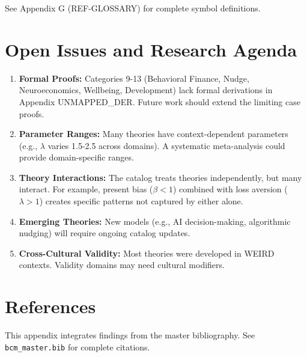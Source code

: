 See Appendix G (REF-GLOSSARY) for complete symbol definitions.

\section{Open Issues and Research Agenda}
\label{sec:ms-open-issues}

\begin{enumerate}
    \item \textbf{Formal Proofs:} Categories 9-13 (Behavioral Finance, Nudge,
          Neuroeconomics, Wellbeing, Development) lack formal derivations in
          Appendix UNMAPPED_DER. Future work should extend the limiting case proofs.

    \item \textbf{Parameter Ranges:} Many theories have context-dependent
          parameters (e.g., $\lambda$ varies 1.5-2.5 across domains). A systematic
          meta-analysis could provide domain-specific ranges.

    \item \textbf{Theory Interactions:} The catalog treats theories independently,
          but many interact. For example, present bias ($\beta < 1$) combined with
          loss aversion ($\lambda > 1$) creates specific patterns not captured
          by either alone.

    \item \textbf{Emerging Theories:} New models (e.g., AI decision-making,
          algorithmic nudging) will require ongoing catalog updates.

    \item \textbf{Cross-Cultural Validity:} Most theories were developed in
          WEIRD contexts. Validity domains may need cultural modifiers.
\end{enumerate}

\section{References}
\label{sec:ms-references}

This appendix integrates findings from the master bibliography.
See \texttt{bcm\_master.bib} for complete citations.

\nocite{bcm_master}

\label{sec:ms-footer}

